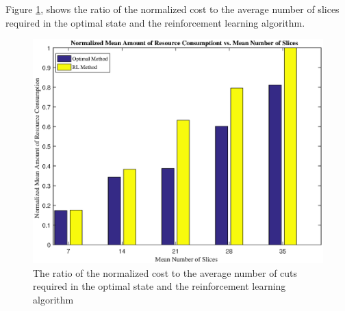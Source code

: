 \documentclass{article}
\begin{document}
Figure \ref{fig:consumptionE}, shows the ratio of the normalized cost to the average number of slices required in the optimal state and the reinforcement learning algorithm.
\begin{figure}[H]
	\centering
	\includegraphics[scale = 0.4]{./fig/consumptionE} %
	\caption{  The ratio of the normalized cost to the average number of cuts required in the optimal state and the reinforcement learning algorithm }
	\label{fig:consumptionE}
\end{figure}
\end{document}
